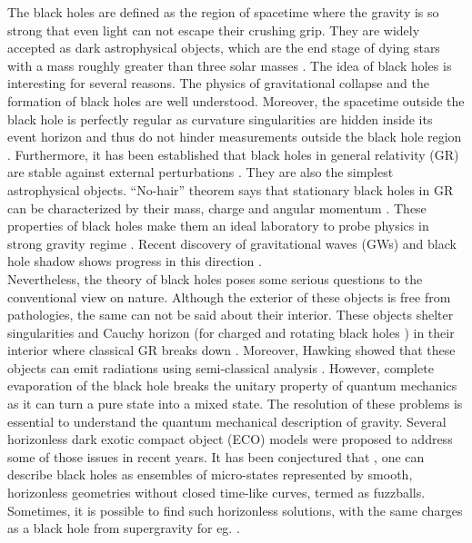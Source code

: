 \documentclass[aps,prd,twocolumn,floatfix,noshowpacs,tightenlines,noshowkeys,superscriptaddress,amsmath,amssymb,
nofootinbib]{revtex4-1}
\renewcommand\[{\begin{equation}}
\renewcommand\]{\end{equation}}
\begin{document}
The black holes are defined as the region of spacetime where the gravity is so strong that even light can not escape their crushing grip. They are widely accepted as dark astrophysical objects, which are the end stage of dying stars with a mass roughly greater than three solar masses \cite{Narayan:2005ie, Mueller:2007rz}. The idea of black holes is interesting for several reasons. The physics of gravitational collapse and the formation of black holes are well understood. Moreover, the spacetime outside the black hole is perfectly regular as curvature singularities are hidden inside its event horizon and thus do not hinder measurements outside the black hole region \cite{Wald:1984rg, Poisson:2009pwt}. Furthermore, it has been established that black holes in general relativity (GR) are stable against external perturbations \cite{PhysRev.108.1063,Klainerman:2017nrb,PhysRevD.9.860,Kay_1987,Dafermos:2008ys,Casals:2019vdb}. They are also the simplest astrophysical objects. ``No-hair'' theorem says that stationary black holes in GR can be characterized by their mass, charge and angular momentum \cite{https://doi.org/10.1002/asna.19752960110,PhysRev.164.1776,PhysRevLett.26.331}. These properties of black holes make them an ideal laboratory to probe physics in strong gravity regime \cite{Berti:2015itd,TheLIGOScientific:2016src,Yunes:2016jcc}. Recent discovery of gravitational waves (GWs) and black hole shadow shows progress in this direction \cite{Abbott:2016blz,LIGOScientific:2019fpa,Akiyama:2019cqa}.\\ 
 Nevertheless, the theory of black holes poses some serious questions to the conventional view on nature. Although the exterior of these objects is free from pathologies, the same can not be said about their interior. These objects shelter singularities and Cauchy horizon (for charged and rotating black holes ) in their interior where classical GR breaks down \cite{1978tpar.book..217P,Reall2018ViewpointAP,Dafermos:2003wr,Cardoso:2017soq,Dias:2018ynt,Rahman:2018oso}. Moreover, Hawking showed that these objects can emit radiations using semi-classical analysis \cite{1998bhp..book.....F}. However, complete evaporation of the black hole breaks the unitary property of quantum mechanics as it can turn a pure state into a mixed state\cite{Mathur:2009hf}. The resolution of these problems is essential to understand the quantum mechanical description of gravity.  Several horizonless dark exotic compact object (ECO) models were proposed to address some of those issues in recent years.  It has been conjectured that \cite{Mathur:2005zp,Bena:2007kg,Bena:2013dka,Skenderis:2008qn,Mathur:2008nj},  one can describe black holes as ensembles of micro-states represented by smooth, horizonless geometries without closed time-like curves, termed as fuzzballs. Sometimes, it is possible to find such horizonless solutions, with the same charges as a black hole from supergravity for eg. \cite{Rychkov:2005ji,Lunin:2001fv,Mathur:2003hj}.
\end{document}
